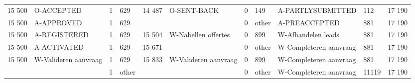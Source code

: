 \begin{tabular}{llllllllllr}
15 500 & O-ACCEPTED & 1 & 629 & 14 487 & O-SENT-BACK & 0 & 149 & A-PARTLYSUBMITTED & 112 & 17 190 \\
15 500 & A-APPROVED & 1 & 629 &  &  & 0 & other & A-PREACCEPTED & 881 & 17 190 \\
15 500 & A-REGISTERED & 1 & 629 & 15 504 & W-Nabellen offertes & 0 & 899 & W-Afhandelen leads & 881 & 17 190 \\
15 500 & A-ACTIVATED & 1 & 629 & 15 671 &  & 0 & other & W-Completeren aanvraag & 881 & 17 190 \\
15 500 & W-Valideren aanvraag & 1 & 629 & 15 833 & W-Valideren aanvraag & 0 & 899 & W-Completeren aanvraag & 881 & 17 190 \\
 &  & 1 & other &  &  & 0 & other & W-Completeren aanvraag & 11119 & 17 190 \\
\bottomrule
\end{tabular}
